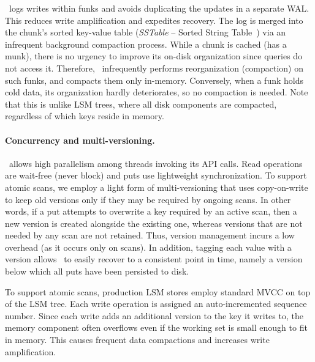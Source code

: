 \sys\ logs writes within funks and avoids duplicating the updates  in a separate WAL. This reduces write amplification and expedites recovery. 
The  log is merged into the chunk's sorted key-value table (\emph{SSTable} -- Sorted String Table~\cite{Bigtable2008}) 
via an infrequent background compaction process. 
While a chunk is cached (has a munk), there is no urgency to improve its on-disk organization since 
queries do not access it. Therefore, \sys\ infrequently performs reorganization (compaction) on such funks,
and compacts them only in-memory.
Conversely, when a funk holds cold data, its organization hardly deteriorates, so no compaction is needed.
Note that this is unlike LSM trees, where all disk components are compacted, regardless of which keys reside in memory.


 \paragraph{Concurrency and multi-versioning.}
 \sys\ allows high parallelism among threads invoking its API calls. 
 Read operations are wait-free (never block) and puts use lightweight synchronization. 
 To support atomic scans, we  employ a light form of multi-versioning that uses 
copy-on-write to keep old versions only if they may be required by ongoing scans. 
In other words, if a put attempts to overwrite a key required by an active scan, then a new version is created alongside the 
existing one, whereas versions that are not needed by any scan are not retained. 
Thus, version management incurs a low overhead (as it occurs only on scans). 
In addition, tagging each value with a version allows \sys\ to easily recover to a consistent point in time, namely a version below which all puts have been persisted to disk.

To support atomic scans, production LSM stores employ standard MVCC on top of the LSM tree.  
Each write operation is assigned an auto-incremented sequence number. Since each write adds an additional version to the key it writes to, the memory component often overflows  even if the working set is small enough to fit in memory. This causes frequent data compactions and increases write amplification.



